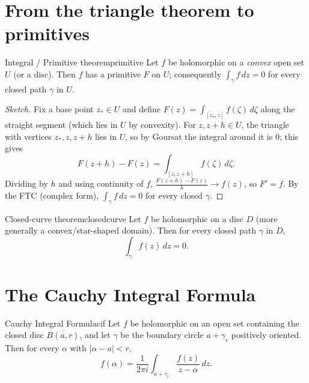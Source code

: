 \documentclass[11pt,openany]{report}
\newcommand{\abs}[1]{\left\lvert #1 \right\rvert}
\begin{document}
\section{From the triangle theorem to primitives}

\begin{theorem}{Integral / Primitive theorem}{primitive}
Let $f$ be holomorphic on a \emph{convex} open set $U$ (or a disc). Then $f$ has a
primitive $F$ on $U$; consequently $\int_\gamma f\,dz=0$ for every closed path $\gamma$ in
$U$.
\end{theorem}

\begin{proof}[Sketch]
Fix a base point $z_*\in U$ and define $F(z)=\int_{[z_*,z]}f(\zeta)\,d\zeta$ along the
straight segment (which lies in $U$ by convexity). For $z,z+h\in U$, the triangle with
vertices $z_*,z,z+h$ lies in $U$, so by Goursat the integral around it is $0$; this gives
\[
  F(z+h)-F(z) = \int_{[z,z+h]}f(\zeta)\,d\zeta .
\]
Dividing by $h$ and using continuity of $f$, $\frac{F(z+h)-F(z)}{h}\to f(z)$, so $F'=f$.
By the FTC (complex form), $\int_\gamma f\,dz=0$ for every closed $\gamma$.
\end{proof}

\begin{theorem}{Closed-curve theorem}{closedcurve}
Let $f$ be holomorphic on a disc $D$ (more generally a convex/star-shaped domain). Then for
every closed path $\gamma$ in $D$,
\[
  \int_\gamma f(z)\,dz = 0 .
\]
\end{theorem}

\section{The Cauchy Integral Formula}

\begin{theorem}{Cauchy Integral Formula}{cif}
Let $f$ be holomorphic on an open set containing the closed disc $\overline{B(a,r)}$, and
let $\gamma$ be the boundary circle $a+\gamma_r$ positively oriented. Then for every
$\alpha$ with $\abs{\alpha-a}<r$,
\[
  \boxed{\ f(\alpha) = \frac{1}{2\pi i}\int_{a+\gamma_r}\frac{f(z)}{z-\alpha}\,dz.\ }
\]
\end{theorem}
\end{document}
